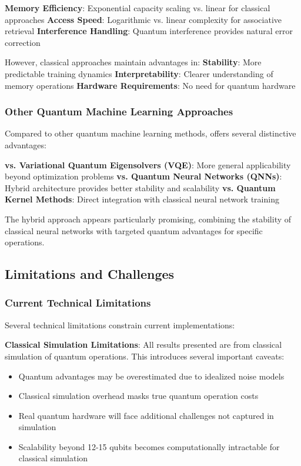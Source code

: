\textbf{Memory Efficiency}: Exponential capacity scaling vs. linear for classical approaches
\textbf{Access Speed}: Logarithmic vs. linear complexity for associative retrieval
\textbf{Interference Handling}: Quantum interference provides natural error correction

However, classical approaches maintain advantages in:
\textbf{Stability}: More predictable training dynamics
\textbf{Interpretability}: Clearer understanding of memory operations
\textbf{Hardware Requirements}: No need for quantum hardware

\subsubsection{Other Quantum Machine Learning Approaches}

Compared to other quantum machine learning methods, \qmann offers several distinctive advantages:

\textbf{vs. Variational Quantum Eigensolvers (VQE)}: More general applicability beyond optimization problems
\textbf{vs. Quantum Neural Networks (QNNs)}: Hybrid architecture provides better stability and scalability
\textbf{vs. Quantum Kernel Methods}: Direct integration with classical neural network training

The hybrid approach appears particularly promising, combining the stability of classical neural networks with targeted quantum advantages for specific operations.

\subsection{Limitations and Challenges}

\subsubsection{Current Technical Limitations}

Several technical limitations constrain current \qmann implementations:

\textbf{Classical Simulation Limitations}: All results presented are from classical simulation of quantum operations. This introduces several important caveats:
\begin{itemize}
    \item Quantum advantages may be overestimated due to idealized noise models
    \item Classical simulation overhead masks true quantum operation costs
    \item Real quantum hardware will face additional challenges not captured in simulation
    \item Scalability beyond 12-15 qubits becomes computationally intractable for classical simulation
\end{itemize}

